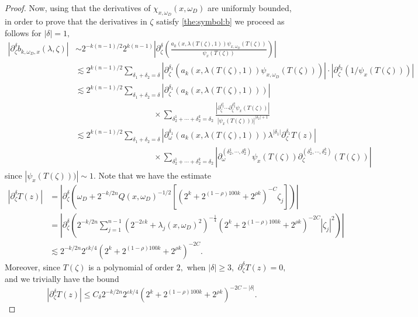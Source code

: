 \documentclass[12pt, reqno]{amsart}
\theoremstyle{definition}
\theoremstyle{remark}
\numberwithin{equation}{section}
\begin{document}
\begin{proof}
Now, using that the derivatives of $\chi_{x,\omega_D}(x,\omega_D)$ are uniformly bounded, in order to prove that the derivatives in $\zeta$ satisfy \eqref{the:symbol:b} we proceed as follows for $|\delta|=1,$
\begin{align*}
    |\partial_\zeta^{\delta}b_{k,\omega_D,x}(\lambda,\zeta)|&\sim 2^{-k(n-1)/2}2^{k(n-1)}|\partial_\zeta^{\delta}\left(\frac{a_k(x,\lambda(T(\zeta),1)) \psi_{x,\omega_D}(T(\zeta))  }{\psi_{x}(T(\zeta))}\right)|\\
    &\lesssim 2^{k(n-1)/2}\sum_{\delta_1+\delta_2=\delta}|\partial_{\zeta}^{\delta_1}(a_k(x,\lambda(T(\zeta),1)) \psi_{x,\omega_D}(T(\zeta)))  |\cdot |\partial_{\zeta}^{\delta_2}(1/\psi_{x}(T(\zeta)))|\\
    &\lesssim 2^{k(n-1)/2}\sum_{\delta_1+\delta_2=\delta}|\partial_{\zeta}^{\delta_1}(a_k(x,\lambda(T(\zeta),1))  )  |\\
    &\hspace{4cm}\times \sum_{\delta_2^1+\cdots +\delta_2^k=\delta_2} \frac{ |\partial_{\zeta}^{\delta_2^{1}}\cdots \partial_{\zeta}^{\delta_2^{k}}\psi_{x}(T(\zeta))|    }{|\psi_{x}(T(\zeta)))|^{|\delta_2|+1}}\\
    &\lesssim 2^{k(n-1)/2}\sum_{\delta_1+\delta_2=\delta}|\partial_{\omega}^{\delta_1}(a_k(x,\lambda(T(\zeta),1))  )\lambda^{|\delta_1|}\partial_\zeta^{\delta_1} T(z)  |\\
    &\hspace{4cm}\times \sum_{\delta_2^1+\cdots +\delta_2^k=\delta_2}  | \partial_{\omega}^{(\delta_2^{1},\cdots,\delta_2^{k}) } \psi_{x}(T(\zeta)) \partial_{\zeta}^{ (\delta_2^{1},\cdots,\delta_2^{k}) }(T(\zeta))    |    
\end{align*}since $|\psi_{x}(T(\zeta)))|\sim 1.$ Note that we have the estimate
\begin{align*}
    |\partial_\zeta^\delta T(z)|&=|\partial_{\zeta}^\delta(\omega_D+2^{-k/2n}Q(x,\omega_D)^{-1/2}[(2^{ k}+2^{(1-\rho)100 k}+2^{\rho k})^{-C}\zeta_j])|\\
    &=|\partial_{\zeta}^{\delta}\left(2^{-k/2n}\sum_{j=1}^{n-1}(2^{-2\varepsilon k}+\lambda_j(x,\omega_D)^{2})^{-\frac{1}{4}}(2^{ k}+2^{(1-\rho)100 k}+2^{\rho k})^{-2C}|\zeta_j|^2\right)|\\
     &\lesssim 2^{-k/2n}2^{\varepsilon k/4}(2^{ k}+2^{(1-\rho)100 k}+2^{\rho k})^{-2C}.
\end{align*} Moreover, since $T(\zeta)$ is a polynomial of order $2,$ when $|\delta|\geq 3,$ $\partial_\zeta^\delta T(z)=0,$ and  we trivially have  the bound
$$  |\partial_\zeta^\delta T(z)|\leq C_{\delta } 2^{-k/2n} 2^{\varepsilon k/4}(2^{ k}+2^{(1-\rho)100 k}+2^{\rho k})^{-2C-|\delta|}.$$

\end{proof}
\end{document}
